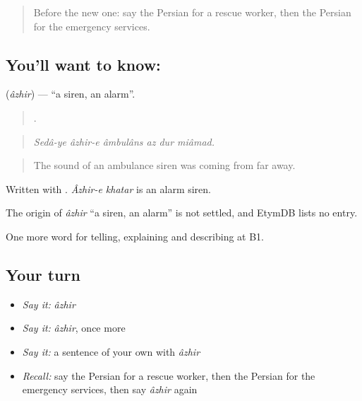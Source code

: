 \label{lesson:FA-C327-azhir}



\begin{quote}
Before the new one: say the Persian for a rescue worker, then the Persian for the emergency services.
\end{quote}

\subsection*{You'll want to know: }
\textbf{} (\emph{âzhir}) — \textquotedblleft{}a siren, an alarm\textquotedblright{}.

\begin{quote}
     .
\end{quote}

\begin{quote}
\emph{Sedâ-ye âzhir-e âmbulâns az dur miâmad.}
\end{quote}

\begin{quote}
The sound of an ambulance siren was coming from far away.
\end{quote}

Written with . \emph{Âzhir-e khatar} is an alarm siren.

\begin{cousinweb}
The origin of \emph{âzhir} \textquotedblleft{}a siren, an alarm\textquotedblright{} is not settled, and EtymDB lists no entry.
\end{cousinweb}

\begin{grammarlens}[title={What you've built}]
One more word for telling, explaining and describing at B1.
\end{grammarlens}

\subsection*{Your turn}
\begin{itemize}
\raggedright
  \item \emph{Say it:} \emph{âzhir}
  \item \emph{Say it:} \emph{âzhir}, once more
  \item \emph{Say it:} a sentence of your own with \emph{âzhir}
  \item \emph{Recall:} say the Persian for a rescue worker, then the Persian for the emergency services, then say \emph{âzhir} again
\end{itemize}

